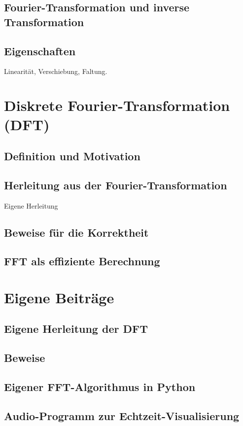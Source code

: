 \documentclass[a4paper,12pt]{article}
\theoremstyle{definition}
\theoremstyle{remark}
\begin{document}
\subsection{Fourier-Transformation und inverse Transformation}
\subsection{Eigenschaften}
Linearität, Verschiebung, Faltung.

\section{Diskrete Fourier-Transformation (DFT)}
\subsection{Definition und Motivation}
\subsection{Herleitung aus der Fourier-Transformation}
Eigene Herleitung
\subsection{Beweise für die Korrektheit}
\subsection{FFT als effiziente Berechnung}

\section{Eigene Beiträge}
\subsection{Eigene Herleitung der DFT}
\subsection{Beweise}
\subsection{Eigener FFT-Algorithmus in Python}
\subsection{Audio-Programm zur Echtzeit-Visualisierung}
\end{document}

